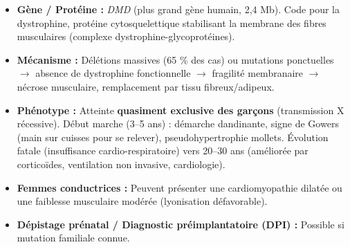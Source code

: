 \documentclass[11pt]{article}
\newcommand{\cle}[1]{{\popxbold\color{popdark}#1}}
\begin{document}
\begin{exemplebox}
\begin{itemize}
    \item \textbf{Gène / Protéine :} \emph{DMD} (plus grand gène humain, 2,4 Mb). Code pour la \cle{dystrophine}, protéine cytosquelettique stabilisant la membrane des fibres musculaires (complexe dystrophine-glycoprotéines).
    \item \textbf{Mécanisme :} Délétions massives (65 \% des cas) ou mutations ponctuelles $\rightarrow$ absence de dystrophine fonctionnelle $\rightarrow$ fragilité membranaire $\rightarrow$ nécrose musculaire, remplacement par tissu fibreux/adipeux.
    \item \textbf{Phénotype :} Atteinte \textbf{quasiment exclusive des garçons} (transmission X récessive). Début marche (3--5 ans) : démarche dandinante, signe de Gowers (main sur cuisses pour se relever), pseudohypertrophie mollets. Évolution fatale (insuffisance cardio-respiratoire) vers 20--30 ans (améliorée par corticoïdes, ventilation non invasive, cardiologie).
    \item \textbf{Femmes conductrices :} Peuvent présenter une cardiomyopathie dilatée ou une faiblesse musculaire modérée (lyonisation défavorable).
    \item \textbf{Dépistage prénatal / Diagnostic préimplantatoire (DPI) :} Possible si mutation familiale connue.
\end{itemize}
\end{exemplebox}
\end{document}
